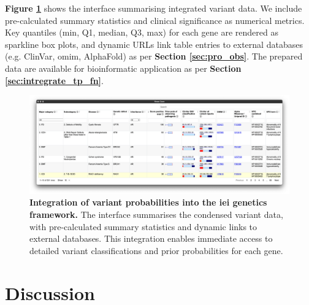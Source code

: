 \textbf{Figure \ref{fig:var_risk_est_iei_genetics}} shows the interface summarising integrated variant data. 
We include pre-calculated summary statistics and clinical significance as numerical metrics. 
Key quantiles (min, Q1, median, Q3, max) for each gene are rendered as sparkline box plots, and dynamic URLs link table entries to external databases (e.g. ClinVar, \ac{omim}, AlphaFold) 
as per \textbf{Section \ref{sec:pro_obs}}.
The prepared data are available for bioinformatic application 
\cite{lawless_2025_15111584} 
as per \textbf{Section \ref{sec:intregrate_tp_fn}}.


\begin{figure}[ht]
  \centering
  \includegraphics[width=1\textwidth]{../images/var_risk_est_iei_genetics.png}
  \caption{
    \textbf{Integration of variant probabilities into the \ac{iei} genetics framework.}
    The interface summarises the condensed variant data, with pre-calculated summary statistics and dynamic links to external databases. This integration enables immediate access to detailed variant classifications and prior probabilities for each gene.
  }
  \label{fig:var_risk_est_iei_genetics}
\end{figure}

\FloatBarrier
\clearpage
\section{Discussion}


